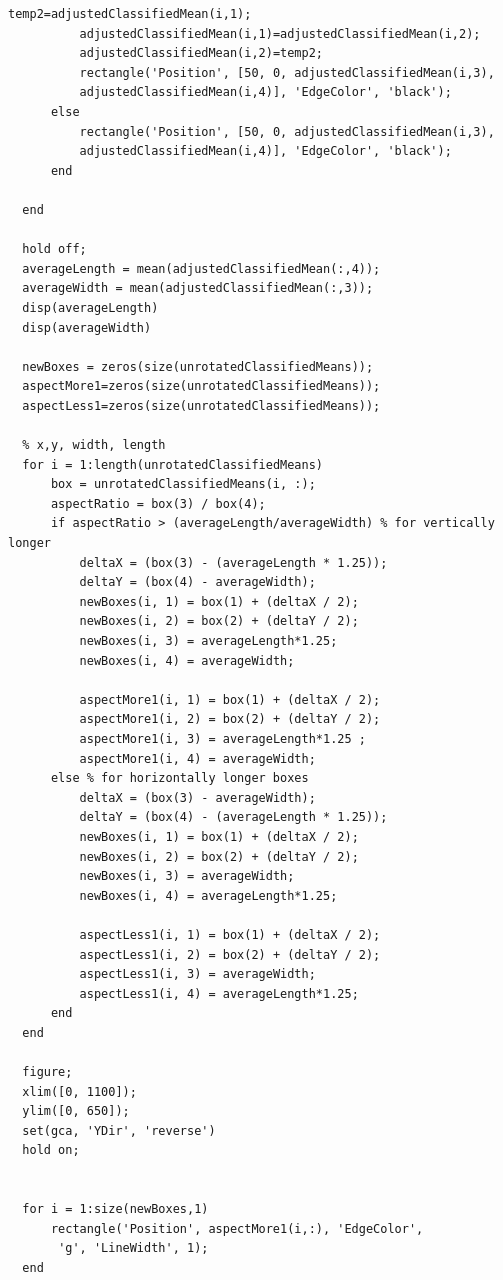\documentclass[man]{apa7}
\begin{document}
\begin{lstlisting}[]
          temp2=adjustedClassifiedMean(i,1);
          adjustedClassifiedMean(i,1)=adjustedClassifiedMean(i,2);
          adjustedClassifiedMean(i,2)=temp2;
          rectangle('Position', [50, 0, adjustedClassifiedMean(i,3),
          adjustedClassifiedMean(i,4)], 'EdgeColor', 'black');
      else
          rectangle('Position', [50, 0, adjustedClassifiedMean(i,3),
          adjustedClassifiedMean(i,4)], 'EdgeColor', 'black');
      end
        
  end
  
  hold off;
  averageLength = mean(adjustedClassifiedMean(:,4));
  averageWidth = mean(adjustedClassifiedMean(:,3));
  disp(averageLength)
  disp(averageWidth)
  
  newBoxes = zeros(size(unrotatedClassifiedMeans));
  aspectMore1=zeros(size(unrotatedClassifiedMeans));
  aspectLess1=zeros(size(unrotatedClassifiedMeans));
  
  % x,y, width, length
  for i = 1:length(unrotatedClassifiedMeans)
      box = unrotatedClassifiedMeans(i, :);
      aspectRatio = box(3) / box(4);
      if aspectRatio > (averageLength/averageWidth) % for vertically longer
          deltaX = (box(3) - (averageLength * 1.25));
          deltaY = (box(4) - averageWidth);
          newBoxes(i, 1) = box(1) + (deltaX / 2);
          newBoxes(i, 2) = box(2) + (deltaY / 2);
          newBoxes(i, 3) = averageLength*1.25;
          newBoxes(i, 4) = averageWidth;
  
          aspectMore1(i, 1) = box(1) + (deltaX / 2);
          aspectMore1(i, 2) = box(2) + (deltaY / 2);
          aspectMore1(i, 3) = averageLength*1.25 ;
          aspectMore1(i, 4) = averageWidth;
      else % for horizontally longer boxes
          deltaX = (box(3) - averageWidth);
          deltaY = (box(4) - (averageLength * 1.25));
          newBoxes(i, 1) = box(1) + (deltaX / 2);
          newBoxes(i, 2) = box(2) + (deltaY / 2);
          newBoxes(i, 3) = averageWidth;
          newBoxes(i, 4) = averageLength*1.25;
  
          aspectLess1(i, 1) = box(1) + (deltaX / 2);
          aspectLess1(i, 2) = box(2) + (deltaY / 2);
          aspectLess1(i, 3) = averageWidth;
          aspectLess1(i, 4) = averageLength*1.25;
      end
  end
  
  figure;
  xlim([0, 1100]);
  ylim([0, 650]);
  set(gca, 'YDir', 'reverse')
  hold on;
  
  
  for i = 1:size(newBoxes,1)
      rectangle('Position', aspectMore1(i,:), 'EdgeColor',
       'g', 'LineWidth', 1);
  end
  

\end{lstlisting}
\end{document}
